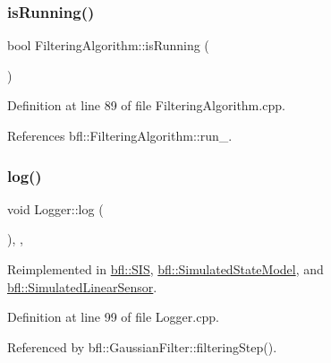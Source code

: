 \subsubsection{\texorpdfstring{is\+Running()}{isRunning()}}
{\footnotesize\ttfamily bool Filtering\+Algorithm\+::is\+Running (\begin{DoxyParamCaption}{ }\end{DoxyParamCaption})\hspace{0.3cm}{\ttfamily [inherited]}}



Definition at line 89 of file Filtering\+Algorithm.\+cpp.



References bfl\+::\+Filtering\+Algorithm\+::run\+\_\+.

\mbox{\label{classbfl_1_1Logger_ad44f46593cb8c4c87c1178eb326e2f64}} 
\subsubsection{\texorpdfstring{log()}{log()}}
{\footnotesize\ttfamily void Logger\+::log (\begin{DoxyParamCaption}{ }\end{DoxyParamCaption})\hspace{0.3cm}{\ttfamily [protected]}, {\ttfamily [virtual]}, {\ttfamily [inherited]}}



Reimplemented in \mbox{\hyperlink{classbfl_1_1SIS_aeb0b87af1cc1fc4b616989ef489ecccc}{bfl\+::\+S\+IS}}, \mbox{\hyperlink{classbfl_1_1SimulatedStateModel_aa022eb0d50d898ffcc831af2907265b2}{bfl\+::\+Simulated\+State\+Model}}, and \mbox{\hyperlink{classbfl_1_1SimulatedLinearSensor_ab75bbe744d8516c97dfc90ad499b10e6}{bfl\+::\+Simulated\+Linear\+Sensor}}.



Definition at line 99 of file Logger.\+cpp.



Referenced by bfl\+::\+Gaussian\+Filter\+::filtering\+Step().

\mbox{\label{classbfl_1_1Logger_a328ceaa8e70e6918f11142b12b8be217}} 
